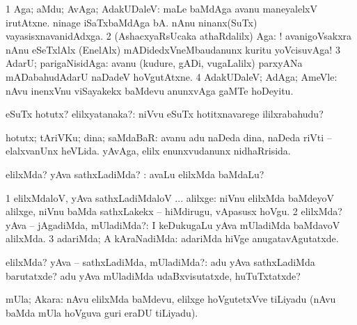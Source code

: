 \bentry
{} 
\gl{\saMavayx}
\expl{}
\bmng
\bnum
\num{1} Aga; aMdu; AvAga; AdakUDaleV:  maLe baMdAga avanu maneyalelxV irutAtxne.  ninage iSaTxbaMdAga bA.  nAnu ninanx(SuTx) vayasisxnavanidAdxga. 
\num{2} (AshacxyaRsUcaka athaRdalilx) Aga: ! avanigoVsakxra nAnu eSeTxlAlx (EnelAlx) mADidedxVneMbaudanunx kuritu yoVcisuvAga! 
\num{3} AdarU; parigaNisidAga:  avanu (kudure, gADi, \mo vugaLalilx) parxyANa mADabahudAdarU naDadeV hoVgutAtxne. 
\num{4} AdakUDaleV; AdAga; AmeVle:  nAvu inenxVnu viSayakekx baMdevu anunxvAga gaMTe hoDeyitu. 
\enum
\emng
\eentry

\bentry
{} 
\gl{\nA}
\expl{}
\bmng
eSuTx hotutx? elilxyatanaka?:  niVvu eSuTx hotitxnavarege ililxrabahudu? 
\emng
\eentry

\bentry
{} 
\gl{\nA}
\expl{}
\bmng
hotutx; tAriVKu; dina; saMdaBaR:  avanu adu naDeda dina, naDeda riVti -- elalxvanUnx heVLida.  yAvAga, elilx enunxvudanunx nidhaRrisida. 
\emng
\eentry

\bentry
{} 
\gl{\kirxvi}
\expl{}
\bmng
elilxMda? yAva sathxLadiMda? :  avaLu elilxMda baMdaLu? 
\emng
\eentry

\bentry
{} 
\gl{\saMavayx}
\expl{}
\bmng
\bnum
\num{1} elilxMdaloV, yAva sathxLadiMdaloV ... alilxge:  niVnu elilxMda baMdeyoV alilxge, niVnu baMda sathxLakekx -- hiMdirugu, vApasusx hoVgu. 
\num{2} elilxMda? yAva -- jAgadiMda, mUladiMda?:  I keDukugaLu yAva mUladiMda baMdavoV alilxMda. 
\num{3} adariMda; A kAraNadiMda:  adariMda hiVge anugatavAgutatxde. 
\enum
\emng
\eentry

\bentry
{} 
\gl{\sanA}
\expl{}
\bmng
elilxMda? yAva -- sathxLadiMda, mUladiMda?:  adu yAva sathxLadiMda barutatxde?  adu yAva mUladiMda udaBxvisutatxde, huTuTxtatxde? 
\emng
\eentry

\bentry
{} 
\gl{\nA}
\expl{}
\bmng
mUla; Akara:  nAvu elilxMda baMdevu, elilxge hoVgutetxVve tiLiyadu (nAvu baMda mUla hoVguva guri eraDU tiLiyadu). 
\emng
\eentry

